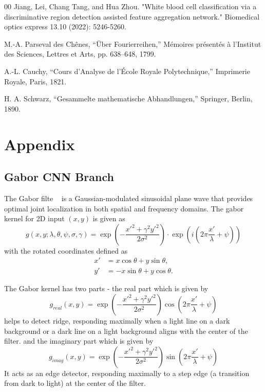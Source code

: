 \documentclass[preprint,12pt]{elsarticle}
\begin{document}
\begin{thebibliography}{00}
Jiang, Lei, Chang Tang, and Hua Zhou. "White blood cell classification via a discriminative region detection assisted feature aggregation network." Biomedical optics express 13.10 (2022): 5246-5260.

M.-A. Parseval des Chênes,
``Über Fourierreihen,''
Mémoires présentés à l’Institut des Sciences, Lettres et Arts, 
pp. 638--648, 1799.

A.-L. Cauchy,
``Cours d’Analyse de l’École Royale Polytechnique,''
Imprimerie Royale, Paris, 1821.

H. A. Schwarz,
``Gesammelte mathematische Abhandlungen,''
Springer, Berlin, 1890.
\end{thebibliography}

\section{Appendix}

\subsection{Gabor CNN Branch}

The Gabor filte ~\cite{b1} is a Gaussian-modulated sinusoidal plane wave that provides optimal joint localization in both spatial and frequency domains. The gabor kernel for 2D input $(x,y)$ is given as
$$g(x, y; \lambda, \theta, \psi, \sigma, \gamma) = \exp\left(-\frac{x'^2 + \gamma^2 y'^2}{2\sigma^2}\right) \cdot \exp\left(i \left(2\pi \frac{x'}{\lambda} + \psi\right)\right)$$
with the rotated coordinates defined as
\[
\begin{aligned}
x' &= x \cos\theta + y \sin\theta, \\
y' &= -x \sin\theta + y \cos\theta.
\end{aligned}
\]

The Gabor kernel has two parts - the real part which is given by
$$g_{real}(x, y) = \exp\left(-\frac{x'^2 + \gamma^2 y'^2}{2\sigma^2}\right) \cos\left(2\pi \frac{x'}{\lambda} + \psi\right)$$
helps to detect ridge, responding maximally when a light line on a dark background or a dark line on a light background aligns with the center of the filter. 
and the imaginary part which is given by 
$$g_{imag}(x, y) = \exp\left(-\frac{x'^2 + \gamma^2 y'^2}{2\sigma^2}\right) \sin\left(2\pi \frac{x'}{\lambda} + \psi\right)$$
It acts as an edge detector, responding maximally to a step edge (a transition from dark to light) at the center of the filter.
\end{document}
